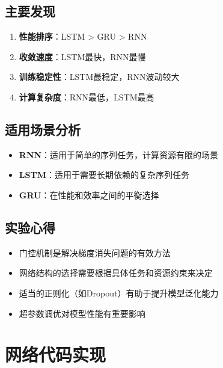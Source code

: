 \documentclass[a4paper]{article}
\begin{document}
\subsection{主要发现}
\begin{enumerate}
    \item \textbf{性能排序}：LSTM > GRU > RNN
    \item \textbf{收敛速度}：LSTM最快，RNN最慢
    \item \textbf{训练稳定性}：LSTM最稳定，RNN波动较大
    \item \textbf{计算复杂度}：RNN最低，LSTM最高
\end{enumerate}

\subsection{适用场景分析}
\begin{itemize}
    \item \textbf{RNN}：适用于简单的序列任务，计算资源有限的场景
    \item \textbf{LSTM}：适用于需要长期依赖的复杂序列任务
    \item \textbf{GRU}：在性能和效率之间的平衡选择
\end{itemize}

\subsection{实验心得}
\begin{itemize}
    \item 门控机制是解决梯度消失问题的有效方法
    \item 网络结构的选择需要根据具体任务和资源约束来决定
    \item 适当的正则化（如Dropout）有助于提升模型泛化能力
    \item 超参数调优对模型性能有重要影响
\end{itemize}

\newpage
\appendix
\section{网络代码实现}
\label{appendix:code}
\end{document}
